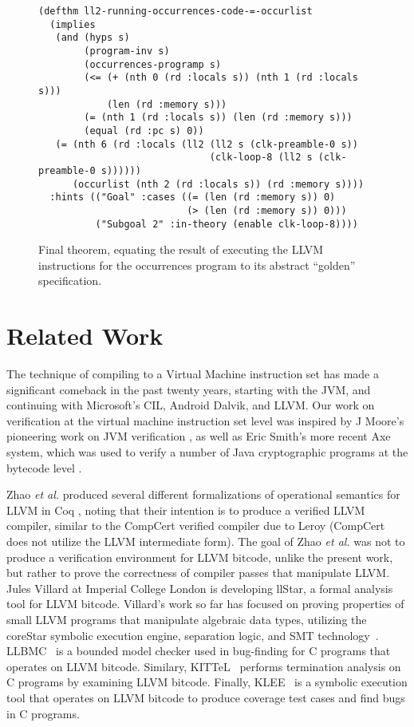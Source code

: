 \documentclass{eptcs}
\begin{document}
\begin{figure*}
\begin{verbatim}
(defthm ll2-running-occurrences-code-=-occurlist
  (implies
   (and (hyps s)
        (program-inv s)
        (occurrences-programp s)
        (<= (+ (nth 0 (rd :locals s)) (nth 1 (rd :locals s))) 
            (len (rd :memory s)))
        (= (nth 1 (rd :locals s)) (len (rd :memory s)))
        (equal (rd :pc s) 0))
   (= (nth 6 (rd :locals (ll2 (ll2 s (clk-preamble-0 s))
                              (clk-loop-8 (ll2 s (clk-preamble-0 s))))))
      (occurlist (nth 2 (rd :locals s)) (rd :memory s))))
  :hints (("Goal" :cases ((= (len (rd :memory s)) 0) 
                          (> (len (rd :memory s)) 0)))
          ("Subgoal 2" :in-theory (enable clk-loop-8))))
\end{verbatim}
\hrulefill
\caption{Final theorem, equating the result of executing the LLVM instructions for
  the occurrences program to its abstract ``golden'' specification.}
\label{FinalThm}
\end{figure*}


\section{Related Work}

The technique of compiling to a Virtual Machine instruction set has made a
significant comeback in the past twenty years, starting with the 
JVM, and continuing with Microsoft's CIL, Android Dalvik, and 
LLVM.  Our work on verification at the virtual machine instruction set level was
inspired by J Moore's pioneering work on JVM verification \cite{MooreJVM99},
as well as Eric Smith's more recent Axe system, which was used to 
verify a number of Java cryptographic programs at the bytecode level \cite{ESmith-diss}.

Zhao \emph{et al.} \cite{Vellvm} produced several different
formalizations of operational semantics for LLVM in Coq
\cite{CoqRefMan}, noting that their intention is to produce a verified
LLVM compiler, similar to the CompCert verified compiler due to Leroy
\cite{Leroy2009} (CompCert does not utilize the LLVM intermediate
form).  The goal of Zhao \emph{et al.} was not to produce a
verification environment for LLVM bitcode, unlike the present work,
but rather to prove the correctness of compiler passes that
manipulate LLVM.  Jules Villard at Imperial College London is developing 
llStar, a formal analysis tool for LLVM bitcode.  Villard's work so
far has focused on proving 
properties of small LLVM programs that manipulate algebraic data types, 
utilizing the coreStar symbolic execution engine, separation logic, 
and SMT technology~\cite{llStar}.  LLBMC~\cite{LLBMC} is a
bounded model checker used in bug-finding for C programs that operates 
on LLVM bitcode.  Similary, KITTeL~\cite{KITTeL} performs termination
analysis on C programs by examining LLVM bitcode.  Finally, 
KLEE~\cite{KLEE} is a symbolic execution tool that operates on LLVM 
bitcode to produce coverage test cases and find bugs in C programs.
\end{document}
